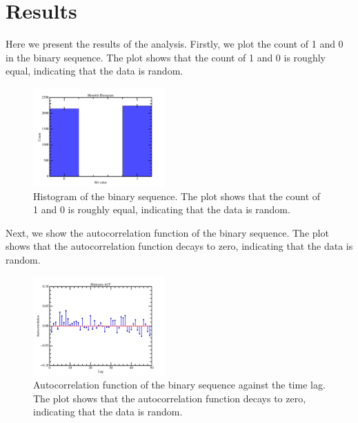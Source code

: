 \section{Results}
Here we present the results of the analysis. Firstly, we plot the count of 1 and 0 in the binary sequence. The plot shows that the count of 1 and 0 is roughly equal, indicating that the data is random.
\begin{figure}
\centering
\includegraphics[width=0.45\textwidth]{figure/plot_monobit_histogram.png}
\caption{Histogram of the binary sequence. The plot shows that the count of 1 and 0 is roughly equal, indicating that the data is random.}
\label{fig:monobit_histogram}

\end{figure}

Next, we show the autocorrelation function of the binary sequence. The plot shows that the autocorrelation function decays to zero, indicating that the data is random.
\begin{figure}
\centering
\includegraphics[width=0.45\textwidth]{figure/plot_autocorrelation.png}
\caption{Autocorrelation function of the binary sequence against the time lag. The plot shows that the autocorrelation function decays to zero, indicating that the data is random.}
\label{fig:autocorrelation}
\end{figure}

